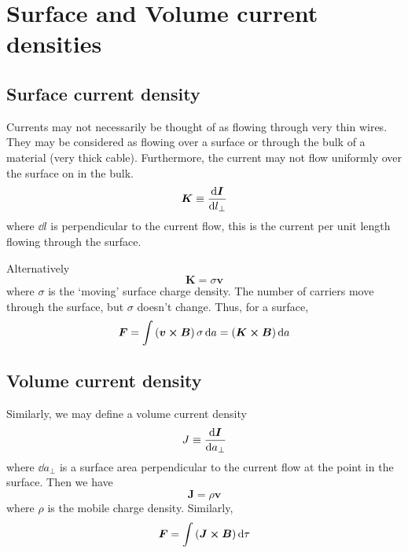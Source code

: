 \documentclass[12pt,chapterprefix=false,dvipsnames]{scrbook}
\theoremstyle{dotless}
\theoremstyle{definition}
\begin{document}
\section{Surface and Volume current densities}%
\label{sec:surface_and_volume_current_densities}

\subsection{Surface current density}%
\label{sub:surface_current_density}

Currents may not necessarily be thought of as flowing through
very thin wires. They may be considered as flowing over a
surface or through the bulk of a material (very thick cable).
Furthermore, the current may not flow uniformly over the surface
on in the bulk.
\begin{equation}
	\bm{K}\equiv\dv{\bm{I}}{l_\perp}
\end{equation}
where $\dd{l}$ is perpendicular to the current
flow, this is the current per unit length flowing through the
surface.

Alternatively
\begin{equation}
	\bm{K}
	=
	\sigma\bm{v}
\end{equation}
where $\sigma$ is the `moving' surface charge
density. The number of carriers move through the surface, but
$\sigma$ doesn't change. Thus, for a surface,
\begin{equation}
	\bm{F} = \int\left(\bm{v}\cross\bm{B}\right)\sigma
	\dd{a}
	=
	\left(\bm{K}\cross\bm{B}\right)\dd{a}
\end{equation}

\subsection{Volume current density}%
\label{sub:volume_current_density}

Similarly, we may define a volume current density
\begin{equation}
	J \equiv\dv{\bm{I}}{a_\perp}
\end{equation}
where $\dd{a_\perp}$ is a surface area perpendicular to
the current flow at the point in the surface. Then we have
\begin{equation}
	\bm{J}
	=
	\rho\bm{v}
\end{equation}
where $\rho$ is the mobile charge density.
Similarly,
\begin{equation}
	\bm{F} = \int
	\left(\bm{J}\cross\bm{B}\right)\dd{\tau}
\end{equation}
\end{document}
